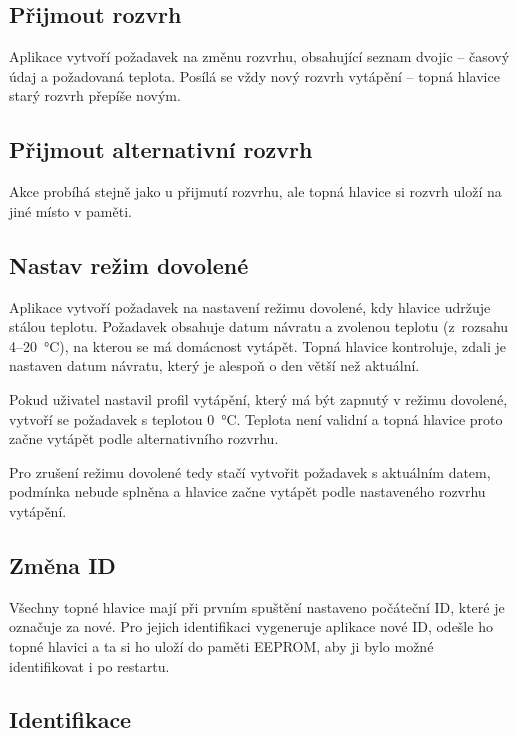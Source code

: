 \documentclass[thesis=B,czech]{FITthesis}[2012/10/20]
\begin{document}
\subsection{Přijmout rozvrh}

Aplikace vytvoří požadavek na změnu rozvrhu, obsahující seznam dvojic -- časový údaj a požadovaná teplota. Posílá se vždy nový rozvrh vytápění -- topná hlavice starý rozvrh přepíše novým.

\subsection{Přijmout alternativní rozvrh}

Akce probíhá stejně jako u přijmutí rozvrhu, ale topná hlavice si rozvrh uloží na jiné místo v paměti.

\subsection{Nastav režim dovolené}

Aplikace vytvoří požadavek na nastavení režimu dovolené, kdy hlavice udržuje stálou teplotu. Požadavek obsahuje datum návratu a zvolenou teplotu (z~rozsahu 4--20~°C), na kterou se má domácnost vytápět. Topná hlavice kontroluje, zdali je nastaven datum návratu, který je alespoň o den větší než aktuální. 

Pokud uživatel nastavil profil vytápění, který má být zapnutý v režimu dovolené, vytvoří se požadavek s teplotou 0~°C. Teplota není validní a topná hlavice proto začne vytápět podle alternativního rozvrhu.

Pro zrušení režimu dovolené tedy stačí vytvořit požadavek s aktuálním datem, podmínka nebude splněna a hlavice začne vytápět podle nastaveného rozvrhu vytápění.


\subsection{Změna ID}

Všechny topné hlavice mají při prvním spuštění nastaveno počáteční ID, které je označuje za nové. Pro jejich identifikaci vygeneruje aplikace nové ID, odešle ho topné hlavici a ta si ho uloží do paměti EEPROM, aby ji bylo možné identifikovat i po restartu.

\subsection{Identifikace}
\end{document}
